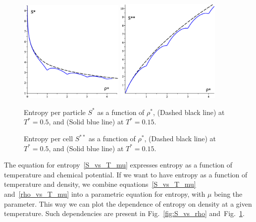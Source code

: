 \documentclass[12pt]{article}
\numberwithin{equation}{section}
\begin{document}
	\begin{figure}[htbp]
		\includegraphics[width=0.45\textwidth,angle=0]{S_vs_rho}
		\hfill
		\includegraphics[width=0.45\textwidth,angle=0]{SS_vs_rho}
		\\
		\parbox{0.45\textwidth}{\caption{\label{fig:S_vs_rho} Entropy per particle $S^{*}$ as a function of $\rho^*$, (Dashed black line) at $T^*=0.5$, and (Solid blue line) at $T^*=0.15$.}}
		\hfill
		\parbox{0.45\textwidth}{\caption{\label{fig:SS_vs_rho} Entropy per cell $S^{**}$ as a function of $\rho^*$, (Dashed black line) at $T^*=0.5$, and (Solid blue line) at $T^*=0.15$.}}
	\end{figure}
	
	The equation for entropy~\eqref{S_vs_T_mu} expresses entropy as a function of temperature and chemical potential. If we want to have entropy as a function of temperature and density, we combine equations~\eqref{S_vs_T_mu} and~\eqref{rho_vs_T_mu} into a parametric equation for entropy, with $\mu$ being the parameter. This way we can plot the dependence of entropy on density at a given temperature. Such dependencies are present in Fig.~\ref{fig:S_vs_rho} and~Fig.~\ref{fig:SS_vs_rho}.
	
	
	
	
	
	\appendix
	
\end{document}
